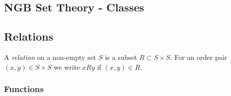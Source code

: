 \subsection{NGB Set Theory - Classes}
\subsection{Relations}
\begin{definition}
    A \textit{relation} on a non-empty set $S$ is a subset $R\subset S\times S$. For an order pair $(x,y)\in S\times S$ we write $xRy$ if $(x,y)\in R$.     
\end{definition}

\subsubsection{Functions}
